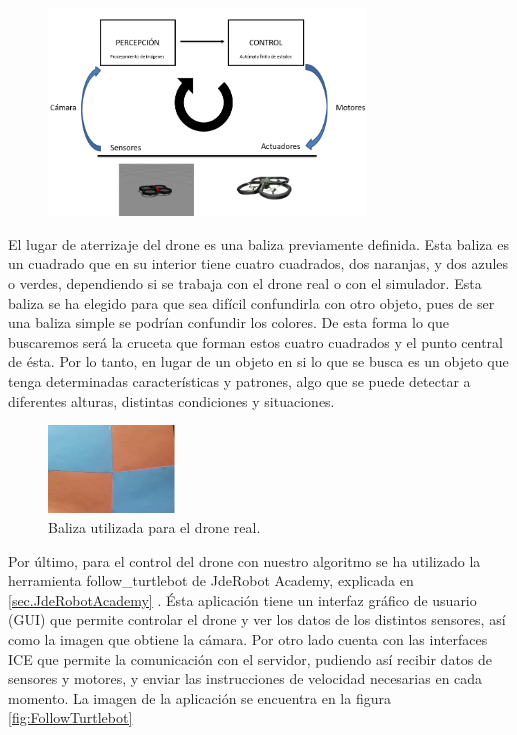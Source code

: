 \begin{figure}[H]
	\centering
		\includegraphics[width=0.75\textwidth]{imgs/esquema2.png}
	\label{fig:esquema_d}
\end{figure}

\hspace{1 cm} El lugar de aterrizaje del drone es una baliza previamente definida. Esta baliza es un cuadrado que en su interior tiene cuatro cuadrados, dos naranjas, y dos azules o verdes, dependiendo si se trabaja con el drone real o con el simulador. Esta baliza se ha elegido para que sea dif\'icil confundirla con otro objeto, pues de ser una baliza simple se podr\'ian confundir los colores. De esta forma lo que buscaremos ser\'a la cruceta que forman estos cuatro cuadrados y el punto central de \'esta. Por lo tanto, en lugar de un objeto en si lo que se busca es un objeto que tenga determinadas caracter\'isticas y patrones, algo que se puede detectar a diferentes alturas, distintas condiciones y situaciones.

\begin{figure}[H]
	\centering
		\includegraphics[width=0.3\textwidth]{imgs/baliza.jpg}
         \caption{Baliza utilizada para el drone real.}
	\label{fig:esquema_d}
\end{figure}


\hspace{1 cm} Por \'ultimo, para el control del drone con nuestro algoritmo se ha utilizado la herramienta follow\_turtlebot de JdeRobot Academy, explicada en \ref{sec.JdeRobotAcademy} . \'Esta aplicaci\'on tiene un interfaz gr\'afico de usuario (GUI) que permite controlar el drone y ver los datos de los distintos sensores, as\'i como la imagen que obtiene la c\'amara. Por otro lado cuenta con las interfaces ICE que permite la comunicaci\'on con el servidor, pudiendo as\'i recibir datos de sensores y motores, y enviar las instrucciones de velocidad necesarias en cada momento. La imagen de la aplicaci\'on se encuentra en la figura \ref{fig:FollowTurtlebot}


